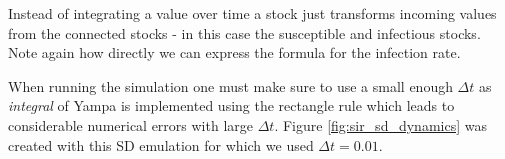 Instead of integrating a value over time a stock just transforms incoming values from the connected stocks - in this case the susceptible and infectious stocks. Note again how directly we can express the formula for the infection rate.

When running the simulation one must make sure to use a small enough $\Delta t$ as \textit{integral} of Yampa is implemented using the rectangle rule which leads to considerable numerical errors with large $\Delta t$. Figure \ref{fig:sir_sd_dynamics} was created with this SD emulation for which we used $\Delta t = 0.01$.